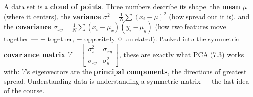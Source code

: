 \documentclass[10pt]{article}
\begin{document}
\vspace{0.10in}

\begin{remindbox}
\small A data set is a \textbf{cloud of points}. Three numbers describe its shape: the \textbf{mean} $\mu$
(where it centers), the \textbf{variance} $\sigma^2=\frac1N\sum(x_i-\mu)^2$ (how spread out it is), and the
\textbf{covariance} $\sigma_{xy}=\frac1N\sum(x_i-\mu_x)(y_i-\mu_y)$ (how two features move together --- $+$
together, $-$ oppositely, $0$ unrelated). Packed into the symmetric \textbf{covariance matrix}
$V=\left[\begin{smallmatrix}\sigma_x^2 & \sigma_{xy}\\ \sigma_{xy} & \sigma_y^2\end{smallmatrix}\right]$, these
are exactly what PCA (7.3) works with: $V$'s eigenvectors are the \textbf{principal components}, the directions
of greatest spread. Understanding data is understanding a symmetric matrix --- the last idea of the course.
\end{remindbox}
\end{document}
